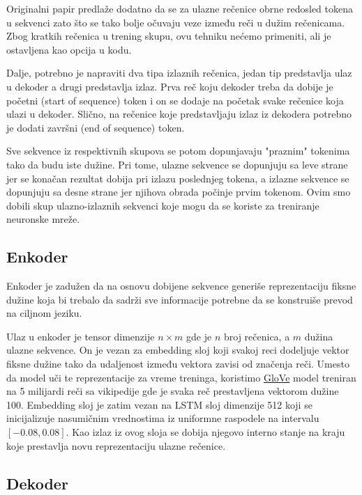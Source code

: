 \documentclass[a4paper]{article}
\begin{document}
Originalni papir predlaže dodatno da se za ulazne rečenice obrne redosled tokena u sekvenci zato što se tako bolje očuvaju veze između reči u dužim rečenicama. Zbog kratkih rečenica u trening skupu, ovu tehniku nećemo primeniti, ali je ostavljena kao opcija u kodu.

Dalje, potrebno je napraviti dva tipa izlaznih rečenica, jedan tip predstavlja ulaz u dekoder a drugi predstavlja izlaz. Prva reč koju dekoder treba da dobije je početni (start of sequence) token i on se dodaje na početak svake rečenice koja ulazi u dekoder. Slično, na rečenice koje predstavljaju izlaz iz dekodera potrebno je dodati završni (end of sequence) token.

Sve sekvence iz respektivnih skupova se potom dopunjavaju "praznim" tokenima tako da budu iste dužine. Pri tome, ulazne sekvence se dopunjuju sa leve strane jer se konačan rezultat dobija pri izlazu poslednjeg tokena, a izlazne sekvence se dopunjuju sa desne strane jer njihova obrada počinje prvim tokenom.
Ovim smo dobili skup ulazno-izlaznih sekvenci koje mogu da se koriste za treniranje neuronske mreže.

\subsection{Enkoder}

Enkoder je zadužen da na osnovu dobijene sekvence generiše reprezentaciju fiksne dužine koja bi trebalo da sadrži sve informacije potrebne da se konstruiše prevod na ciljnom jeziku.

Ulaz u enkoder je tensor dimenzije $n \times m$ gde je $n$ broj rečenica, a $m$ dužina ulazne sekvence. On je vezan za embedding sloj koji svakoj reci dodeljuje vektor fiksne dužine tako da udaljenost između vektora zavisi od značenja reči.
Umesto da model uči te reprezentacije za vreme treninga, koristimo \href{https://nlp.stanford.edu/projects/glove/}{GloVe} model \cite{pennington2014glove} treniran na 5 milijardi reči sa vikipedije gde je svaka reč prestavljena vektorom dužine 100. 
Embedding sloj je zatim vezan na LSTM sloj dimenzije 512 koji se inicijalizuje nasumičnim vrednostima iz uniformne raspodele na intervalu $[-0.08, 0.08]$. Kao izlaz iz ovog sloja se dobija njegovo interno stanje na kraju koje prestavlja novu reprezentaciju ulazne rečenice.

\subsection{Dekoder}
\end{document}
